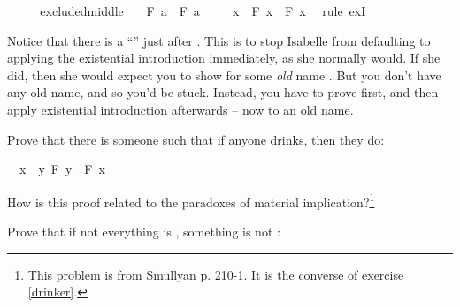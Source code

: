 \begin{isabellebody}
%
\isadelimproof
%
\endisadelimproof
%
\isatagproof
{}\isamarkupfalse%
\ {\isacharminus}\isanewline
\ \ \isamarkupfalse%
\ excluded{\isacharunderscore}middle\ \isamarkupfalse%
\ {\isachardoublequoteopen}{\isasymnot}\ F\ a\ {\isasymor}\ F\ a{\isachardoublequoteclose}\isacommand{{\isachardot}}\isamarkupfalse%
\isanewline
\ \ \isamarkupfalse%
\ {\isachardoublequoteopen}{\isasymexists}\ x{\isachardot}\ {\isasymnot}\ F\ x\ {\isasymor}\ F\ x{\isachardoublequoteclose}\ \isamarkupfalse%
\ {\isacharparenleft}rule\ exI{\isacharparenright}\isanewline
{}\isamarkupfalse%
%
\endisatagproof
{\isafoldproof}%
%
\isadelimproof
%
\endisadelimproof
%
\begin{isamarkuptext}%
Notice that there is a ``\isa{{\isacharminus}}'' just after . This is to stop Isabelle from
defaulting to applying the existential introduction immediately, as she normally would. If she did, then
she would expect you to show  for some \emph{old} name . But you don't
have any old name, and so you'd be stuck. Instead, you have to prove  first, and
then apply existential introduction afterwards -- now to an old name.%
\end{isamarkuptext}\isamarkuptrue%
%
\begin{isamarkuptext}%
\begin{Exercise}[title = The Converse Drinkers Principle, label = conversedrinker]
Prove that there is someone such that if anyone drinks, then they do: \end{Exercise}%
\end{isamarkuptext}\isamarkuptrue%
\isamarkupfalse%
\ {\isachardoublequoteopen}{\isasymexists}\ x{\isachardot}\ {\isacharparenleft}{\isasymexists}\ y{\isachardot}\ F\ y{\isacharparenright}\ {\isasymlongrightarrow}\ F\ x{\isachardoublequoteclose}%
\isadelimproof
\ %
\endisadelimproof
%
\isatagproof
{}\isamarkupfalse%
%
\endisatagproof
{\isafoldproof}%
%
\isadelimproof
%
\endisadelimproof
%
\begin{isamarkuptext}%
How is this proof related to the paradoxes of material implication?\footnote{This problem is
from Smullyan \cite{smullyan_what_1978} p. 210-1. It is the converse of exercise \ref{drinker}.}%
\end{isamarkuptext}\isamarkuptrue%
%
\begin{isamarkuptext}%
\begin{Exercise}[label = demorgan] Prove that if not everything is , something is not : \end{Exercise}%

\end{isamarkuptext}
\end{isabellebody}
